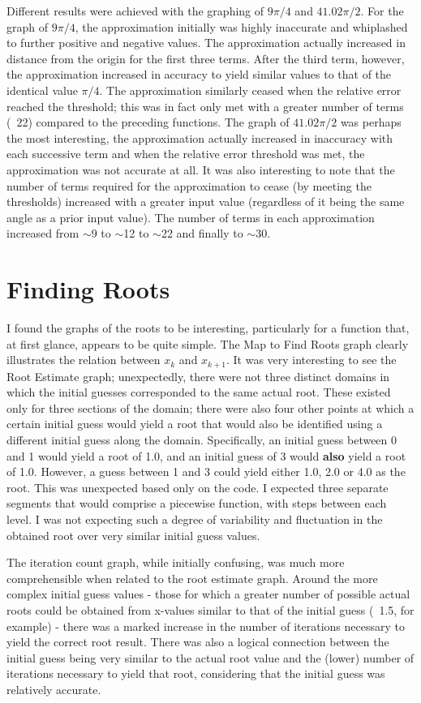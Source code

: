 \documentclass{article}
\begin{document}
Different results were achieved with the graphing of $9\pi/4$ and $41.02\pi/2$. For the graph of $9\pi/4$, the approximation initially was highly inaccurate and whiplashed
to further positive and negative values. The approximation actually increased in distance from the origin for the first three terms. After the third term, however, the approximation increased in accuracy to yield similar values to that of the identical value $\pi/4$. The approximation similarly ceased when the relative error reached the threshold; this was in fact only met with a greater number of terms (~22) compared to the preceding functions. The graph of $41.02\pi/2$ was perhaps the most interesting, the approximation actually increased in inaccuracy with each successive term and when the relative error threshold was met, the approximation was not accurate at all. It was also interesting to note that the number of terms required for the approximation to cease (by meeting the thresholds) increased with a greater input value (regardless of it being the same angle as a prior input value). The number of terms in each approximation increased from $\sim$9 to $\sim$12 to $\sim$22 and finally to $\sim$30. 

\section{Finding Roots}
I found the graphs of the roots to be interesting, particularly for a function that, at first glance,
appears to be quite simple. The Map to Find Roots graph clearly illustrates the relation between $x_k$ and $x_{k+1}$. 
It was very interesting to see the Root Estimate graph; unexpectedly, there were not three distinct domains in which the initial guesses
corresponded to the same actual root. These existed only for three sections of the domain; there were also four other points at which a certain initial guess
would yield a root that would also be identified using a different initial guess along the domain. Specifically, an initial guess between 0 and 1 would yield a root
of 1.0, and an initial guess of 3 would \textbf{also} yield a root of 1.0. However, a guess between 1 and 3 could yield either 1.0, 2.0 or 4.0 as the root. This was unexpected
based only on the code. I expected three separate segments that would comprise a piecewise function, with steps between each level. I was not expecting such a 
degree of variability and fluctuation in the obtained root over very similar initial guess values. 

The iteration count graph, while initially confusing, was much more comprehensible when related to the root estimate graph. Around the more complex initial guess values 
- those for which a greater number of possible actual roots could be obtained from x-values similar to that of the initial guess (~1.5, for example) - there was a marked
increase in the number of iterations necessary to yield the correct root result. There was also a logical connection between the initial guess being very similar to the
actual root value and the (lower) number of iterations necessary to yield that root, considering that the initial guess was relatively accurate.  
\end{document}
